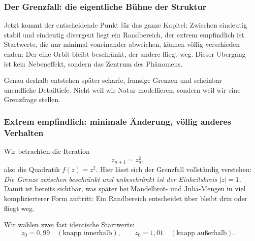\newpage
\noindent

\subsubsection*{Der Grenzfall: die eigentliche Bühne der Struktur}

Jetzt kommt der entscheidende Punkt für das ganze Kapitel:
Zwischen eindeutig stabil und eindeutig divergent liegt ein Randbereich, der extrem empfindlich ist.
Startwerte, die nur minimal voneinander abweichen, können völlig verschieden enden:
Der eine Orbit bleibt beschränkt, der andere fliegt weg.
Dieser Übergang ist kein Nebeneffekt, sondern das Zentrum des Phänomens.

Genau deshalb entstehen später scharfe, fransige Grenzen und scheinbar unendliche Detailtiefe.
Nicht weil wir Natur modellieren, sondern weil wir eine Grenzfrage stellen.

\subsubsection*{Extrem empfindlich: minimale Änderung, völlig anderes Verhalten}

Wir betrachten die Iteration
\[
z_{n+1}=z_n^2,
\]
also die Quadratik $f(z)=z^2$.
Hier lässt sich der Grenzfall vollständig verstehen:
\emph{Die Grenze zwischen beschränkt und unbeschränkt ist der Einheitskreis $|z|=1$.}
Damit ist bereits sichtbar, was später bei Mandelbrot- und Julia-Mengen in viel komplizierterer Form auftritt:
Ein Randbereich entscheidet über \glqq bleibt drin\grqq{} oder \glqq fliegt weg\grqq.

Wir wählen zwei fast identische Startwerte:
\[
z_0=0{,}99 \quad (\text{knapp innerhalb}), 
\qquad z_0=1{,}01 \quad (\text{knapp außerhalb}).
\]

